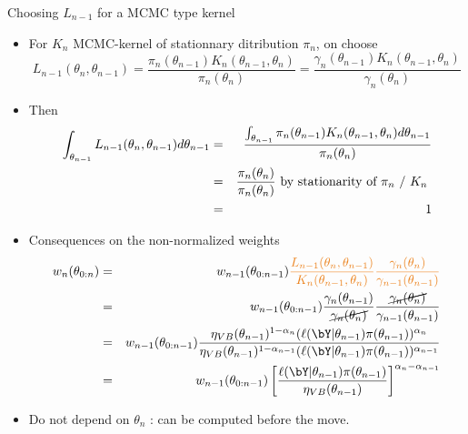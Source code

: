 \begin{frame}[allowframebreaks]{Choosing $L_{n-1}$ for a MCMC type kernel}
\begin{itemize}
\item For  $K_n$ MCMC-kernel of stationnary ditribution $\pi_n$,   on choose 
$$L_{n-1}(\theta_n,\theta_{n-1}) = \frac{\pi_n(\theta_{n-1}) K_n(\theta_{n-1},\theta_n)}{\pi_n(\theta_n)} =\frac{\gamma_n(\theta_{n-1}) K_n(\theta_{n-1},\theta_n)}{\gamma_n(\theta_n)}  $$
\item Then
\begin{eqnarray*}
\int_{\theta_{n-1}} L_{n-1}(\theta_n,\theta_{n-1}) d \theta_{n-1} &=& \frac{  \int_{\theta_{n-1}} \pi_n(\theta_{n-1}) K_n(\theta_{n-1},\theta_n)d \theta_{n-1}}{\pi_n(\theta_n)} \\
&=&  \frac{\pi_n(\theta_n)}{\pi_n(\theta_n)} \mbox{ by stationarity of $\pi_n$ /  $ K_n$ } \\
&=& 1 
\end{eqnarray*}

\item Consequences on the non-normalized weights
\begin{eqnarray*}
w_{n}(\theta_{0:n}) &=&w_{n-1}(\theta_{0:n-1})   \vert \frac{L_{n-1}(\theta_{n}, \theta_{n-1})}{ K_n(\theta_{n-1}, \theta_{n})}\frac{\gamma_n(\theta_n)}{\gamma_{n-1}(\theta_{n-1})} \noir \\
&=&w_{n-1}(\theta_{0:n-1})  \frac{ \gamma_n(\theta_{n-1}) }{\cancel{\gamma_n(\theta_n)}}\frac{\cancel{\gamma_n(\theta_n)}}{\gamma_{n-1}(\theta_{n-1})}  \\
&=& w_{n-1}(\theta_{0:n-1})\frac{ \eta_{VB}(\theta_{n-1})^{1- \alpha_n} (\ell(\bY | \theta_{n-1}) \pi(\theta_{n-1}))^{\alpha_n}}{ \eta_{VB}(\theta_{n-1})^{1- \alpha_{n-1}} (\ell(\bY | \theta_{n-1}) \pi(\theta_{n-1}))^{\alpha_{n-1}}}\\
&=& w_{n-1}(\theta_{0:n-1}) \left[\frac{\ell(\bY | \theta_{n-1}) \pi(\theta_{n-1})}{\eta_{VB}(\theta_{n-1})} \right]^{\alpha_n-\alpha_{n-1}} 
\end{eqnarray*}



\item Do not depend on  $\theta_n$ : can be computed before the move. 


\end{itemize}
\end{frame}




